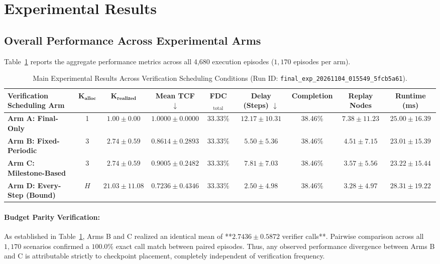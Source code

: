 \section{Experimental Results}
\label{sec:results}

\subsection{Overall Performance Across Experimental Arms}
Table~\ref{tab:main_results} reports the aggregate performance metrics across all 4,680 execution episodes ($1,170$ episodes per arm).

\begin{table}[t]
\centering
\small
\caption{Main Experimental Results Across Verification Scheduling Conditions (Run ID: \texttt{final\_exp\_20261104\_015549\_5fcb5a61}).}
\label{tab:main_results}
\begin{tabular}{lcccccccc}
\toprule
\textbf{Verification Scheduling Arm} & $\mathbf{K_{\text{alloc}}}$ & $\mathbf{K_{\text{realized}}}$ & \textbf{Mean TCF} $\downarrow$ & \textbf{FDC}$_{\text{total}}$ & \textbf{Delay (Steps)} $\downarrow$ & \textbf{Completion} & \textbf{Replay Nodes} & \textbf{Runtime (ms)} \\
\midrule
\textbf{Arm A: Final-Only} & 1 & $1.00 \pm 0.00$ & $1.0000 \pm 0.0000$ & 33.33\% & $12.17 \pm 10.31$ & 38.46\% & $7.38 \pm 11.23$ & $25.00 \pm 16.39$ \\
\textbf{Arm B: Fixed-Periodic} & 3 & $\mathbf{2.74 \pm 0.59}$ & $\mathbf{0.8614 \pm 0.2893}$ & 33.33\% & $\mathbf{5.50 \pm 5.36}$ & 38.46\% & $4.51 \pm 7.15$ & $\mathbf{23.01 \pm 15.39}$ \\
\textbf{Arm C: Milestone-Based} & 3 & $\mathbf{2.74 \pm 0.59}$ & $0.9005 \pm 0.2482$ & 33.33\% & $7.81 \pm 7.03$ & 38.46\% & $3.57 \pm 5.56$ & $23.22 \pm 15.44$ \\
\textbf{Arm D: Every-Step (Bound)} & $H$ & $21.03 \pm 11.08$ & $0.7236 \pm 0.4346$ & 33.33\% & $2.50 \pm 4.98$ & 38.46\% & $3.28 \pm 4.97$ & $28.31 \pm 19.22$ \\
\bottomrule
\end{tabular}
\end{table}

\paragraph{Budget Parity Verification:}
As established in Table~\ref{tab:main_results}, Arms B and C realized an identical mean of **$2.7436 \pm 0.5872$ verifier calls**. Pairwise comparison across all $1,170$ scenarios confirmed a $100.0\%$ exact call match between paired episodes. Thus, any observed performance divergence between Arms B and C is attributable strictly to checkpoint placement, completely independent of verification frequency.

